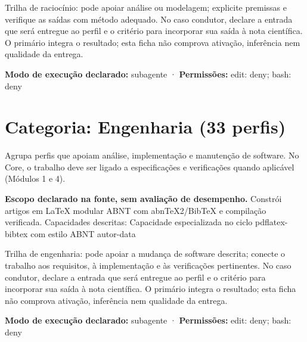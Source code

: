 \begin{funcao}
Trilha de raciocínio: pode apoiar análise ou modelagem; explicite premissas e verifique as saídas com método adequado. No caso condutor, declare a entrada que será entregue ao perfil e o critério para incorporar sua saída à nota científica. O primário integra o resultado; esta ficha não comprova ativação, inferência nem qualidade da entrega.
\end{funcao}

\begin{arquitetura}
\textbf{Modo de execução declarado:} subagente · \textbf{Permissões:} edit: deny; bash: deny
\end{arquitetura}

\clearpage
\section{Categoria: Engenharia (33 perfis)}

\begin{descricao}
Agrupa perfis que apoiam análise, implementação e manutenção de software. No Core, o trabalho deve ser ligado a especificações e verificações quando aplicável (Módulos 1 e 4).
\end{descricao}


\begin{descricao}
\textbf{Escopo declarado na fonte, sem avaliação de desempenho.}
Constrói artigos em LaTeX modular ABNT com abnTeX2/BibTeX e compilação verificada. Capacidades descritas: Capacidade especializada no ciclo pdflatex-bibtex com estilo ABNT autor-data
\end{descricao}

\begin{funcao}
Trilha de engenharia: pode apoiar a mudança de software descrita; conecte o trabalho aos requisitos, à implementação e às verificações pertinentes. No caso condutor, declare a entrada que será entregue ao perfil e o critério para incorporar sua saída à nota científica. O primário integra o resultado; esta ficha não comprova ativação, inferência nem qualidade da entrega.
\end{funcao}

\begin{arquitetura}
\textbf{Modo de execução declarado:} subagente · \textbf{Permissões:} edit: deny; bash: deny
\end{arquitetura}

